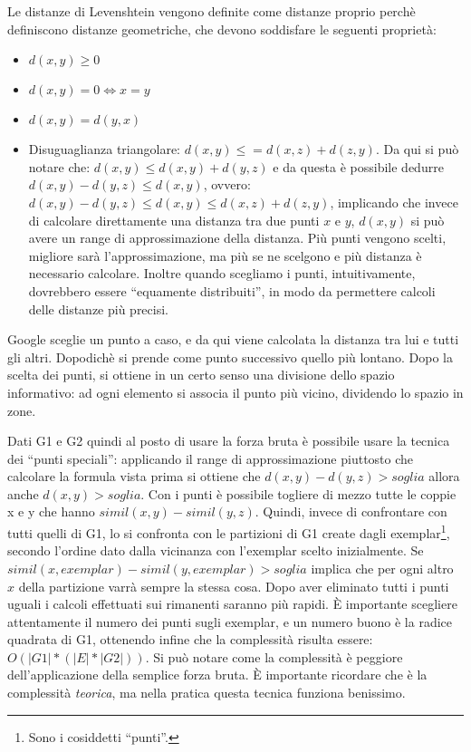 Le distanze di Levenshtein vengono definite come distanze proprio perch\`e definiscono distanze geometriche, che devono soddisfare le seguenti propriet\`a:
\begin{itemize}
\item $d(x,y) \ge 0$
\item $d(x,y)=0 \Leftrightarrow x=y$
\item $d(x,y) = d(y,x)$
\item Disuguaglianza triangolare: $d(x,y) \le = d(x,z) + d(z,y)$. Da qui si pu\`o notare che: $d(x,y) \le d(x,y)+d(y,z)$ e da questa \`e possibile dedurre $d(x,y)-d(y,z) \le d(x,y)$, ovvero: $d(x,y)-d(y,z) \le d(x,y) \le d(x,z)+d(z,y)$, implicando che invece di calcolare direttamente una distanza tra due punti $x$ e $y$, $d(x,y)$ si pu\`o avere un range di approssimazione della distanza. Pi\`u punti vengono scelti, migliore sar\`a l'approssimazione, ma pi\`u se ne scelgono e pi\`u distanza \`e necessario calcolare. Inoltre quando scegliamo i punti, intuitivamente, dovrebbero essere ``equamente distribuiti'', in modo da permettere calcoli delle distanze pi\`u precisi.
\end{itemize}

Google sceglie un punto a caso, e da qui viene calcolata la distanza tra lui e tutti gli altri. Dopodich\`e si prende come punto successivo quello pi\`u lontano. Dopo la scelta dei punti, si ottiene in un certo senso una divisione dello spazio informativo: ad ogni elemento si associa il punto pi\`u vicino, dividendo lo spazio in zone.

Dati G1 e G2 quindi al posto di usare la forza bruta \`e possibile usare la tecnica dei ``punti speciali'': applicando il range di approssimazione piuttosto che calcolare la formula vista prima si ottiene che $d(x,y)-d(y,z) > soglia$ allora anche $d(x,y) > soglia$. Con i punti \`e possibile togliere di mezzo tutte le coppie x e y che hanno $simil(x,y) - simil(y,z)$. Quindi, invece di confrontare con tutti quelli di G1, lo si confronta con le partizioni di G1 create dagli exemplar\footnote{Sono i cosiddetti ``punti''.}, secondo l'ordine dato dalla vicinanza con l'exemplar scelto inizialmente. Se $simil(x,exemplar)-simil(y,exemplar) > soglia$ implica che per ogni altro $x$ della partizione varr\`a sempre la stessa cosa. Dopo aver eliminato tutti i punti uguali i calcoli effettuati sui rimanenti saranno pi\`u rapidi.
\`E importante scegliere attentamente il numero dei punti sugli exemplar, e un numero buono \`e la radice quadrata di G1, ottenendo infine che la complessit\`a risulta essere: $O(|G1|*(|E|*|G2|))$. Si pu\`o notare come la complessit\`a \`e peggiore dell'applicazione della semplice forza bruta. \`E importante ricordare che \`e la complessit\`a \textit{teorica}, ma nella pratica questa tecnica funziona benissimo.

